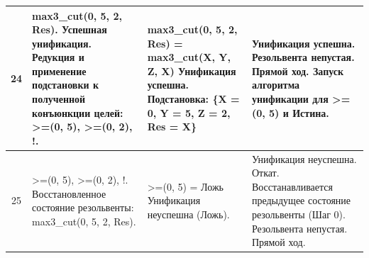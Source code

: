 \begin{tabularx}{\textwidth}{|c|>{\small}X|>{\small}X|>{\small}X|}
	24                                                                                             &
	max3\_cut(0, 5, 2, Res). \newline
	Успешная унификация. \newline
	Редукция и применение подстановки к полученной конъюнкции целей: \newline
	>=(0, 5), \newline
	>=(0, 2), \newline
	!.                                                                                             &
	max3\_cut(0, 5, 2, Res) = \newline
	max3\_cut(X, Y, Z, X) \newline
	Унификация успешна. \newline
	Подстановка: \newline
	\{X = 0, Y = 5, Z = 2, Res = X\}                                                               &
	Унификация успешна. \newline
	Резольвента непустая. \newline
	Прямой ход. \newline
	Запуск алгоритма унификации для >=(0, 5) и Истина.                                               \\
	\hline

	25                                                                                             &
	>=(0, 5), \newline
	>=(0, 2), \newline
	!. \newline
	Восстановленное состояние резольвенты: \newline
	max3\_cut(0, 5, 2, Res).                                                                       &
	>=(0, 5) = \newline
	Ложь \newline
	Унификация неуспешна (Ложь).                                                                   &
	Унификация неуспешна. \newline
	Откат. Восстанавливается предыдущее состояние резольвенты (Шаг 0). \newline
	Резольвента непустая. \newline
	Прямой ход.                                                                                      \\
	\hline


\end{tabularx}
